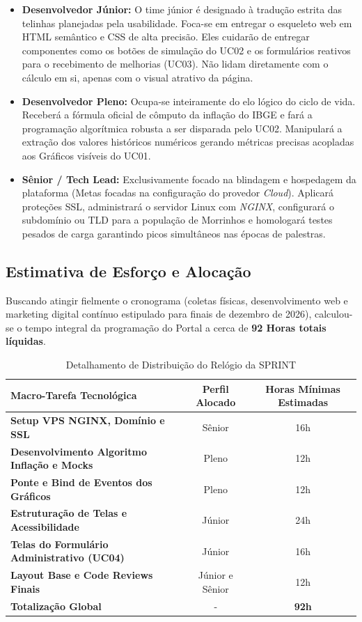 \documentclass[12pt]{article}
\begin{document}
\begin{itemize}[leftmargin=*]
    \item \textbf{Desenvolvedor Júnior:} O time júnior é designado à tradução estrita das telinhas planejadas pela usabilidade. Foca-se em entregar o esqueleto web em HTML semântico e CSS de alta precisão. Eles cuidarão de entregar componentes como os botões de simulação do UC02 e os formulários reativos para o recebimento de melhorias (UC03). Não lidam diretamente com o cálculo em si, apenas com o visual atrativo da página.
    
    \item \textbf{Desenvolvedor Pleno:} Ocupa-se inteiramente do elo lógico do ciclo de vida. Receberá a fórmula oficial de cômputo da inflação do IBGE e fará a programação algorítmica robusta a ser disparada pelo UC02. Manipulará a extração dos valores históricos numéricos gerando métricas precisas acopladas aos Gráficos visíveis do UC01.
    
    \item \textbf{Sênior / Tech Lead:} Exclusivamente focado na blindagem e hospedagem da plataforma (Metas focadas na configuração do provedor \textit{Cloud}). Aplicará proteções SSL, administrará o servidor Linux com \textit{NGINX}, configurará o subdomínio ou TLD para a população de Morrinhos e homologará testes pesados de carga garantindo picos simultâneos nas épocas de palestras.
\end{itemize}

\subsection{Estimativa de Esforço e Alocação}
Buscando atingir fielmente o cronograma (coletas físicas, desenvolvimento web e marketing digital contínuo estipulado para finais de dezembro de 2026), calculou-se o tempo integral da programação do Portal a cerca de \textbf{92 Horas totais líquidas}.

\begin{table}[H]
\centering
\caption{Detalhamento de Distribuição do Relógio da SPRINT}
\label{tab:horas}
\begin{tabular}{|l|c|c|}
\hline
\textbf{Macro-Tarefa Tecnológica} & \textbf{Perfil Alocado} & \textbf{Horas Mínimas Estimadas} \\ \hline
\textbf{Setup VPS NGINX, Domínio e SSL} & Sênior & 16h  \\ \hline
\textbf{Desenvolvimento Algoritmo Inflação e Mocks}& Pleno & 12h  \\ \hline
\textbf{Ponte e Bind de Eventos dos Gráficos} & Pleno & 12h  \\ \hline
\textbf{Estruturação de Telas e Acessibilidade}& Júnior & 24h  \\ \hline
\textbf{Telas do Formulário Administrativo (UC04)}& Júnior & 16h  \\ \hline
\textbf{Layout Base e Code Reviews Finais} & Júnior e Sênior & 12h  \\ \hline
\textbf{Totalização Global} & - & \textbf{92h}  \\ \hline
\end{tabular}
\end{table}
\end{document}
